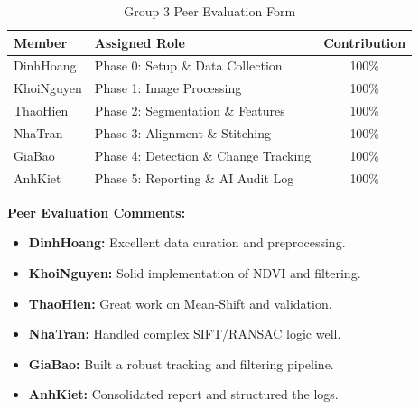 \documentclass[12pt,a4paper]{article}
\begin{document}
\begin{table}[H]
    \centering
    \caption{Group 3 Peer Evaluation Form}
    \label{tab:peer_evaluation}
    \begin{tabular}{|l|l|c|}
        \hline
        \textbf{Member} & \textbf{Assigned Role} & \textbf{Contribution} \\
        \hline
        DinhHoang & Phase 0: Setup \& Data Collection & 100\% \\
        KhoiNguyen & Phase 1: Image Processing & 100\% \\
        ThaoHien & Phase 2: Segmentation \& Features & 100\% \\
        NhaTran & Phase 3: Alignment \& Stitching & 100\% \\
        GiaBao & Phase 4: Detection \& Change Tracking & 100\% \\
        AnhKiet & Phase 5: Reporting \& AI Audit Log & 100\% \\
        \hline
    \end{tabular}
\end{table}

\textbf{Peer Evaluation Comments:}
\begin{itemize}
    \item \textbf{DinhHoang:} Excellent data curation and preprocessing.
    \item \textbf{KhoiNguyen:} Solid implementation of NDVI and filtering.
    \item \textbf{ThaoHien:} Great work on Mean-Shift and validation.
    \item \textbf{NhaTran:} Handled complex SIFT/RANSAC logic well.
    \item \textbf{GiaBao:} Built a robust tracking and filtering pipeline.
    \item \textbf{AnhKiet:} Consolidated report and structured the logs.
\end{itemize}
\end{document}
